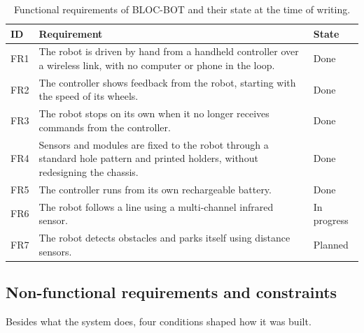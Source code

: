 \begin{table}[htbp]
  \centering
  \caption{Functional requirements of BLOC-BOT and their state at the time of writing.}
  \label{tab:requirements}
  \begin{tabularx}{\textwidth}{@{}l X l@{}}
    \toprule
    ID & Requirement & State \\
    \midrule
    FR1 & The robot is driven by hand from a handheld controller over a wireless link,
          with no computer or phone in the loop. & Done \\
    FR2 & The controller shows feedback from the robot, starting with the speed of its
          wheels. & Done \\
    FR3 & The robot stops on its own when it no longer receives commands from the
          controller. & Done \\
    FR4 & Sensors and modules are fixed to the robot through a standard hole pattern and
          printed holders, without redesigning the chassis. & Done \\
    FR5 & The controller runs from its own rechargeable battery. & Done \\
    FR6 & The robot follows a line using a multi-channel infrared sensor. & In progress \\
    FR7 & The robot detects obstacles and parks itself using distance sensors. & Planned \\
    \bottomrule
  \end{tabularx}
\end{table}

\subsection{Non-functional requirements and constraints}
Besides what the system does, four conditions shaped how it was built.

